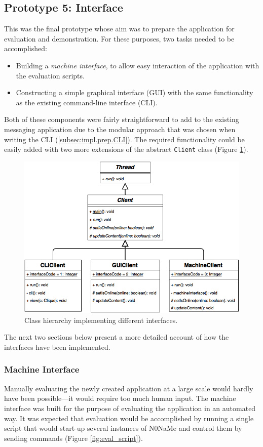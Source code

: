 \documentclass[a4paper, twoside, 12pt]{report}
\newcommand{\funkytt}{\fontfamily{AnonymousPro}\selectfont}
\begin{document}
\subsection{Prototype 5: Interface}
\label{subsec:impl.proto.interface}
This was the final prototype whose aim was to prepare the application for evaluation and demonstration. For these purposes, two tasks needed to be accomplished:
\begin{itemize}
    \item Building a \emph{machine interface}, to allow easy interaction of the application with the evaluation scripts.
    \item Constructing a simple graphical interface (GUI) with the same functionality as the existing command-line interface (CLI).
\end{itemize}

Both of these components were fairly straightforward to add to the existing messaging application due to the modular approach that was chosen when writing the CLI (\cref{subsec:impl.prep.CLI}). The required functionality could be easily added with two more extensions of the abstract \texttt{Client} class (Figure \ref{fig:Client_UI}).

\begin{figure}[H]
    \captionsetup{width=0.80\textwidth}
    \centering
    \includegraphics[width=0.76\linewidth]{pics/Client_UI.png}
    \caption{\label{fig:Client_UI} Class hierarchy implementing different interfaces.}
\end{figure}
The next two sections below present a more detailed account of how the interfaces have been implemented.

\subsubsection{Machine Interface}
Manually evaluating the newly created application at a large scale would hardly have been possible---it would require too much human input. The machine interface was built for the purpose of evaluating the application in an automated way. It was expected that evaluation would be accomplished by running a single script that would start-up several instances of {\funkytt N0NaMe} and control them by sending commands (Figure \ref{fig:eval_script}).
\end{document}
